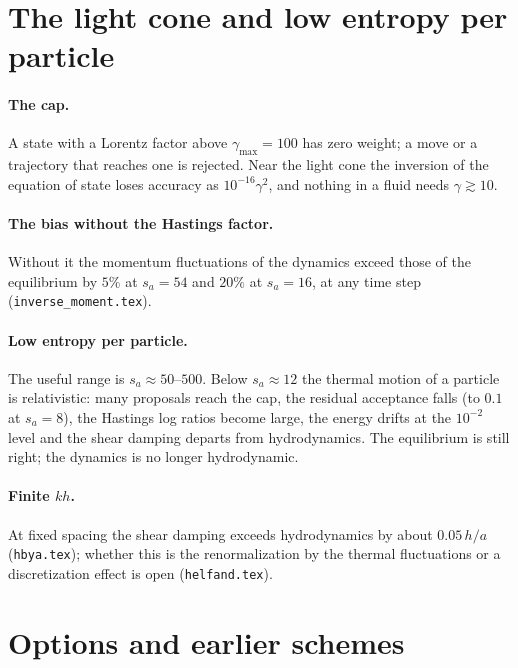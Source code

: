 \documentclass[11pt,aps,preprint,nofootinbib,superscriptaddress,tightenlines]{revtex4-2}
\let\oldparagraph\paragraph
\renewcommand{\paragraph}{\par\bigskip\oldparagraph}
\begin{document}
\section{The light cone and low entropy per particle}
\label{app:limits}

\paragraph{The cap.}  A state with a Lorentz factor above $\gamma_{\max}=100$ has zero weight; a move or a trajectory that reaches one is rejected.
Near the light cone the inversion of the equation of state loses accuracy as $10^{-16}\gamma^2$, and nothing in a fluid needs $\gamma\gtrsim10$.

\paragraph{The bias without the Hastings factor.}  Without it the momentum fluctuations of the dynamics exceed those of the equilibrium by
$5\%$ at $s_a=54$ and $20\%$ at $s_a=16$, at any time step (\texttt{inverse\_moment.tex}).

\paragraph{Low entropy per particle.}  The useful range is $s_a\approx50$--$500$.  Below $s_a\approx12$ the thermal motion of a particle is relativistic: many proposals reach the cap, the
residual acceptance falls (to $0.1$ at $s_a=8$), the Hastings log ratios become large, the energy drifts at the $10^{-2}$ level and the shear
damping departs from hydrodynamics.  The equilibrium is still right; the dynamics is no longer hydrodynamic.

\paragraph{Finite $kh$.}  At fixed spacing the shear damping exceeds hydrodynamics by about $0.05\,h/a$ (\texttt{hbya.tex}); whether this is the
renormalization by the thermal fluctuations or a discretization effect is open (\texttt{helfand.tex}).

\section{Options and earlier schemes}
\label{app:options}
\end{document}
